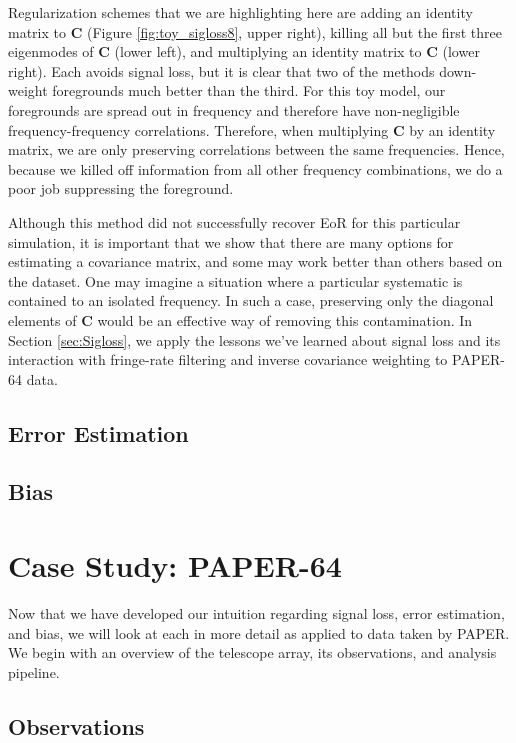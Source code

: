 \documentclass[preprint2,numberedappendix,tighten,twocolappendix]{aastex6}  %
\begin{document}
Regularization schemes that we are highlighting here are adding an identity matrix to $\textbf{C}$ (Figure \ref{fig:toy_sigloss8}, upper right), killing all but the first three eigenmodes of $\textbf{C}$ (lower left), and multiplying an identity matrix to $\textbf{C}$ (lower right). Each avoids signal loss, but it is clear that two of the methods down-weight foregrounds much better than the third. For this toy model, our foregrounds are spread out in frequency and therefore have non-negligible frequency-frequency correlations. Therefore, when multiplying $\textbf{C}$ by an identity matrix, we are only preserving correlations between the same frequencies. Hence, because we killed off information from all other frequency combinations, we do a poor job suppressing the foreground.  

Although this method did not successfully recover EoR for this particular simulation, it is important that we show that there are many options for estimating a covariance matrix, and some may work better than others based on the dataset. One may imagine a situation where a particular systematic is contained to an isolated frequency. In such a case, preserving only the diagonal elements of $\textbf{C}$ would be an effective way of removing this contamination. In Section \ref{sec:Sigloss}, we apply the lessons we've learned about signal loss and its interaction with fringe-rate filtering and inverse covariance weighting to PAPER-64 data.

\subsection{Error Estimation}
\label{sec:ErrorOverview}

\subsection{Bias}
\label{sec:BiasOverview}

\section{Case Study: PAPER-64}
\label{sec:CaseStudy}

Now that we have developed our intuition regarding signal loss, error estimation, and bias, we will look at each in more detail as applied to data taken by PAPER. We begin with an overview of the telescope array, its observations, and analysis pipeline.

\subsection{Observations}
\label{sec:Obs}
\end{document}
